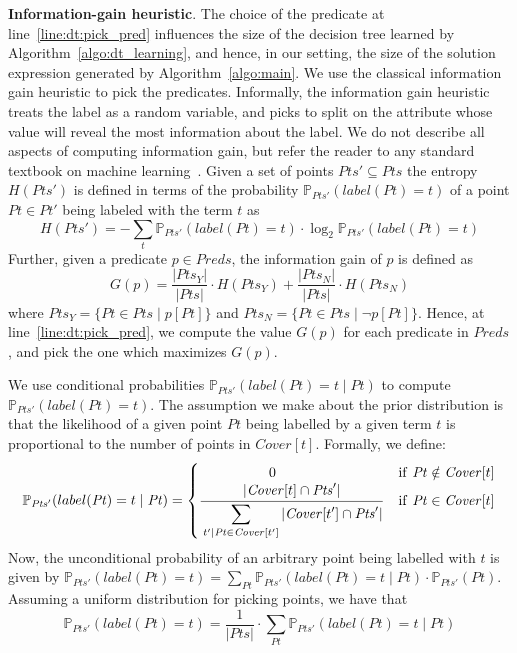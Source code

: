 \documentclass{llncs}
\newcommand\Points{\mathit{Pts}}
\newcommand\Point{\mathit{Pt}}
\newcommand\Predicates{\mathit{Preds}}
\newcommand\Pred{p}
\newcommand\Term{t}
\newcommand\Cover{\mathit{Cover}}
\newcommand\Prob[2]{\mathbb{P}_{#1}(#2)}
\renewcommand{\paragraph}[1]{\par\noindent\textbf{#1}.}
\begin{document}
\paragraph{Information-gain heuristic}
The choice of the predicate at line~\ref{line:dt:pick_pred} influences
the size of the decision tree learned by
Algorithm~\ref{algo:dt_learning}, and hence, in our setting, the size of
the solution expression generated by Algorithm~\ref{algo:main}.
We use the classical information gain heuristic to pick the predicates.
Informally, the information gain heuristic treats the label as a random
variable, and picks to split on the attribute whose value will reveal
the most information about the label.
We do not describe all aspects of computing information gain, but
refer the reader to any standard textbook on machine
learning~\cite{bishop-book}.
Given a set of points $\Points' \subseteq \Points$ the entropy
$H(\Points')$ is defined in terms of the probability
$\Prob{\Points'}{label(\Point) = t}$ of a point $\Point \in \Point'$ being
labeled with the term $\Term$ as
\[
H(\Points') = -\sum_{\Term} \Prob{\Points'}{label(\Point) = \Term} \cdot \log_2{\Prob{\Points'}{label(\Point) = \Term}}
\]
Further, given a predicate $\Pred \in \Predicates$, the information
gain of $\Pred$ is defined as
\[
G(\Pred) = \frac{|\Points_{Y}|}{|\Points|} \cdot
H(\Points_{Y}) + \frac{|\Points_{N}|}{|\Points|} \cdot
H(\Points_{N})
\]
where $\Points_{Y} = \{\Point \in \Points \mid \Pred[\Point]\}$ and
$\Points_{N} = \{\Point \in \Points \mid \neg\Pred[\Point]\}$.
Hence, at line~\ref{line:dt:pick_pred}, we compute the value $G(\Pred)$
for each predicate in $\Predicates$, and pick the one which maximizes
$G(\Pred)$.

We use conditional probabilities $\Prob{\Points'}{label(\Point) = \Term \mid
\Point}$ to compute $\Prob{\Points'}{label(\Point) = t}$.
The assumption we make about the prior distribution is that the
likelihood of a given point $\Point$ being labelled by a given term
$\Term$ is proportional to the number of points in $\Cover[\Term]$.
Formally, we define:
\[
    \Prob{\Points'}{label(\Point) = t \mid \Point} =
    \begin{cases}
        \qquad\qquad\quad 0  & \mathrm{if}\ \Point \notin \Cover[\Term]\\
      \displaystyle
      \frac{\strut\displaystyle\vert \Cover[\Term] \cap \Points' \vert}{\strut\displaystyle\sum_{\Term'
          | \Point \in \Cover[\Term']} \vert \Cover[\Term'] \cap \Points' \vert } & \mathrm{if}\
      \Point \in \Cover[\Term] \\
    \end{cases}
\]
Now, the unconditional probability of an arbitrary point being labelled
with $\Term$ is given by $\Prob{\Points'}{label(\Point) = \Term} = \sum_{\Point}
\Prob{\Points'}{label(\Point) = \Term \mid \Point}\cdot\Prob{\Points'}{\Point}$.
Assuming a uniform distribution for picking points, we have that
\[
    \Prob{\Points'}{label(\Point) = t} =  \frac{1}{\vert \Points \vert} \cdot \sum_{\Point} \Prob{\Points'}{label(\Point) = \Term \mid \Point}
\]
\end{document}
